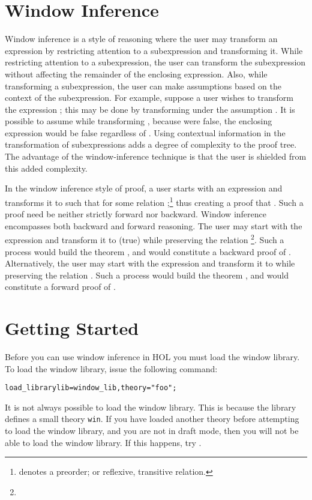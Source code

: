 \section{Window Inference}

Window inference is a style of reasoning where the user may transform an
expression by restricting attention to a subexpression and transforming it.
While restricting attention to a subexpression, the user can transform the
subexpression without affecting the remainder of the enclosing expression.
Also, while transforming a subexpression, the user can make assumptions based
on the context of the subexpression.
For example, suppose a user wishes to transform the expression
;
this may be done by transforming  under the assumption .
It is possible to assume  while transforming ,
because were  false,
the enclosing expression  would be false regardless of
.
Using contextual information in the transformation of subexpressions adds a
degree of complexity to the proof tree.
The advantage of the window-inference technique is that the user is shielded
from this added complexity.

In the window inference style of proof,
a user starts with an expression  and transforms it to  such
that  for some relation
;\footnote{ denotes a preorder; or reflexive,
transitive relation.}
thus creating a proof that .
Such a proof need be neither strictly forward nor backward.
Window inference encompasses both backward and forward reasoning.
The user may start with the expression  and transform it to
(true) while preserving the relation
\footnote
{ }.
Such a process would build the theorem ,
and would constitute a backward proof of .
Alternatively,
the user may start with the expression  and transform it to
 while preserving the relation .
Such a process would build the theorem ,
and would constitute a forward proof of .

\section{Getting Started}	\label{sec:start}

Before you can use window inference in HOL you must load the
window library.
To load the window library, issue the following command:
\begin{hol}\begin{alltt}
    load_library{lib=window_lib,theory="foo"};
\end{alltt}\end{hol}
It is not always possible to load the window library.
This is because the library defines a small theory {\tt win}.
If you have loaded another theory before attempting to load the window
library, and you are not in draft mode, then you will not be able to 
load the window library.
If this happens, try .

